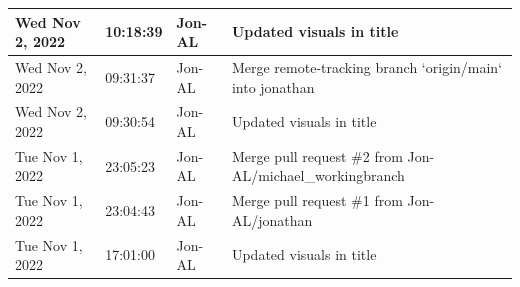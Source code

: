 \documentclass[11pt]{article}
\begin{document}
\begin{center}
\begin{longtable}{|p{2.7cm}|l|p{2cm}|p{8cm}|}
           \hline Wed Nov 2, 2022                            & 10:18:39                           & Jon-AL                                  & Updated visuals in title                                                                                                                                                                                                                                                                                   \\
           \hline Wed Nov 2, 2022                            & 09:31:37                           & Jon-AL                                  & Merge remote-tracking branch `origin/main` into jonathan                                                                                                                                                                                                                                                   \\
           \hline Wed Nov 2, 2022                            & 09:30:54                           & Jon-AL                                  & Updated visuals in title                                                                                                                                                                                                                                                                                   \\
           \hline Tue Nov 1, 2022                            & 23:05:23                           & Jon-AL                                  & Merge pull request \#2 from Jon-AL/michael\_workingbranch                                                                                                                                                                                                                                                    \\
           \hline Tue Nov 1, 2022                            & 23:04:43                           & Jon-AL                                  & Merge pull request \#1 from Jon-AL/jonathan                                                                                                                                                                                                                                                                 \\
           \hline Tue Nov 1, 2022                            & 17:01:00                           & Jon-AL                                  & Updated visuals in title                                                                                                                                                                                                                                                                                   \\

\end{longtable}
\end{center}
\end{document}
